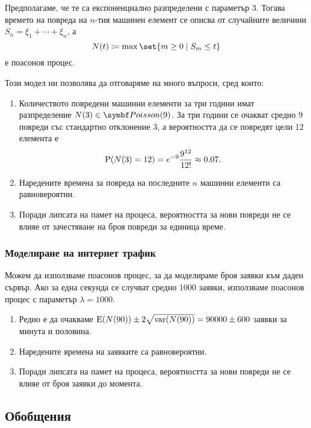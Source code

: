 \documentclass{../../common/topic}
\begin{document}
Предполагаме, че те са експоненциално разпределени с параметър \( 3 \). Тогава времето на повреда на \( n \)-тия машинен елемент се описва от случайните величини \( S_n = \xi_1 + \cdots + \xi_n \), а
\begin{equation*}
  N(t) \coloneqq \max \set{ m \geq 0 \mid S_m \leq t }
\end{equation*}
е поасонов процес.

Този модел ни позволява да отговаряме на много въпроси, сред които:
\begin{enumerate}
  \item Количеството повредени машинни елементи за три години имат разпределение \( N(3) \in \distr{Poisson}(9) \). За три години се очакват средно \( 9 \) повреди със стандартно отклонение \( 3 \), а вероятността да се повредят цели \( 12 \) елемента е
  \begin{equation*}
    \operatorname{P}(N(3) = 12) = e^{-9} \frac {9^{12}} {12!} \approx 0.07.
  \end{equation*}

  \item Наредените времена за повреда на последните \( n \) машинни елементи са равновероятни.
  \item Поради липсата на памет на процеса, вероятността за нови повреди не се влияе от зачестяване на броя повреди за единица време.
\end{enumerate}

\subsubsection{Моделиране на интернет трафик}

Можем да използваме поасонов процес, за да моделираме броя заявки към даден сървър. Ако за една секунда се случват средно \( 1000 \) заявки, използваме поасонов процес с параметър \( \lambda = 1000 \).
\begin{enumerate}
  \item Редно е да очакваме \( \operatorname{E}(N(90)) \pm 2\sqrt{\operatorname{var}(N(90))} = 90000 \pm 600 \) заявки за минута и половина.
  \item Наредените времена на заявките са равновероятни.
  \item Поради липсата на памет на процеса, вероятността за нови повреди не се влияе от броя заявки до момента.
\end{enumerate}

\subsection{Обобщения}
\end{document}

